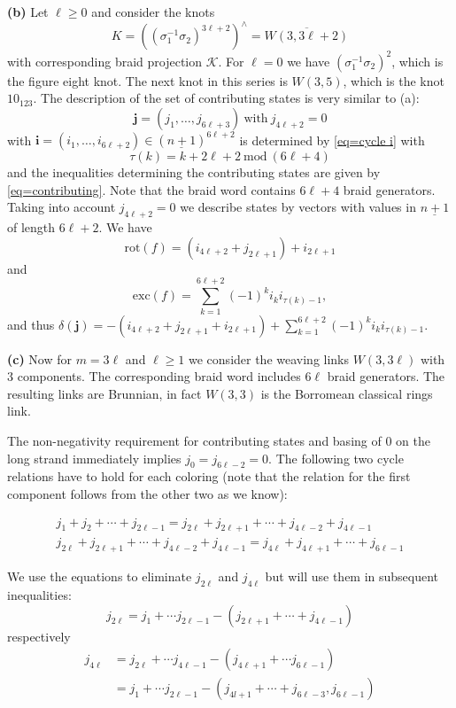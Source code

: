 \documentclass[11pt]{article}
\theoremstyle{definition}
\theoremstyle{remark}
\theoremstyle{remark}
\begin{document}
\noindent \textbf{(b)} Let $\ell \geq 0$ and consider the knots
$$K=\left((\sigma_1^{-1}\sigma_2)^{3\ell +2}\right)^{\wedge}=\overline{W(3,3\ell +2)}$$
 with corresponding braid projection $\mathcal{K}$. 
For $\ell =0$ we have $(\sigma_1^{-1}\sigma_2)^2$, which is the figure eight knot. The next knot in this series is $W(3,5)$, which is the knot $10_{123}$. The description of the set of contributing states is very similar to (a): 
$$\mathbf{j}=(j_1,\ldots ,j_{6\ell +3}) \ \textrm{with}\  j_{4\ell +2}=0$$
with $\mathbf{i}=(i_1,\ldots ,i_{6\ell +2})\in (\underline{n+1})^{6\ell +2}$ is determined by \eqref{eq=cycle i}
with 
$$\tau (k)=k+2\ell +2\ \textrm{mod}\ (6\ell +4)$$
and the inequalities determining the contributing states are given by \eqref{eq=contributing}.
Note that the braid word contains $6\ell +4$ braid generators. Taking into account $j_{4\ell +2 }=0$ we describe states by vectors 
with values in $\underline{n+1}$ of length $6\ell +2$.
We have 
$$\textrm{rot}(f)=(i_{4\ell +2}+j_{2\ell +1})+i_{2\ell +1}$$
and 
$$\textrm{exc}(f)=\sum_{k=1}^{6\ell +2}(-1)^ki_ki_{\tau (k)-1},$$ and thus 
$\delta (\mathbf{j})=-(i_{4\ell +2}+j_{2\ell +1}+i_{2\ell +1})+\sum_{k=1}^{6\ell +2}(-1)^ki_ki_{\tau (k)-1}$. 

\vskip 0.1in

\noindent \textbf{(c)} Now for $m=3\ell $ and $\ell \geq 1$ we consider the weaving links $W(3,3\ell )$ with $3$ components.
The corresponding braid word includes $6\ell $ braid generators. The resulting links are Brunnian, in fact $W(3,3)$ is the Borromean classical rings link. 

The non-negativity requirement for contributing states and basing of $0$ on the long strand immediately implies $j_0=j_{6\ell -2}=0$. The following two cycle relations have to hold for each coloring (note that the relation for the first component follows from the other two as we know):

\begin{align*} 
j_1+j_2+\cdots +j_{2\ell -1}=j_{2\ell}+j_{2\ell +1}+\cdots +j_{4\ell -2}+j_{4\ell -1}\\
j_{2\ell}+j_{2\ell +1}+\cdots +j_{4\ell -2}+j_{4\ell -1}=j_{4\ell }+j_{4\ell +1}+\cdots +j_{6\ell -1}
\end{align*}

We use the equations to eliminate $j_{2\ell }$ and $j_{4\ell }$ but will use them in subsequent inequalities:
$$j_{2\ell }=j_1+\cdots j_{2\ell -1}-(j_{2\ell +1}+\cdots +j_{4\ell -1})$$
respectively 
\begin{align*}
j_{4\ell }&=j_{2\ell }+\cdots j_{4\ell -1}-(j_{4\ell +1}+\cdots j_{6\ell -1})\\
&=j_1+\cdots j_{2\ell -1}-(j_{4l+1}+\cdots +j_{6\ell -3}, j_{6\ell -1})
\end{align*}
\end{document}
